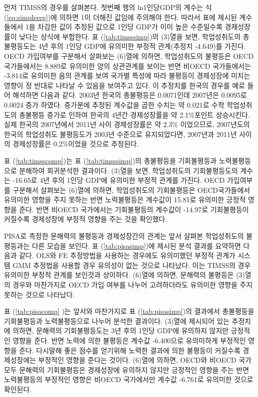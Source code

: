 
먼저 TIMSS의 경우를 살펴본다.
첫번째 행의 ln1인당GDP의 계수는 식 (\ref{eq:simplereg})에 의하면 1이 더해진 값임에 주의해야 한다. 따라서 표에 제시된 계수들에서 1을 차감한 값이 추정된 값으로 1인당 GDP가 이미 높은 수준일수록 경제성장률이 낮다는 상식에 부합한다.
표 (\ref{tab:timsssimp})의 (3)열을 보면, 학업성취도의 총불평등도는 4년 후의 1인당 GDP에 유의미한 부정적 관계(추정치 -4.649)를 가진다.
OECD 가입여부를 구분해서 살펴보는 (6)열에 의하면, 학업성취도의 불평등은 OECD국가들에서는 8.889로 유의미한 양의 상관관계를 보이는 반면 비OECD 국가들에서는 -3.814로 유의미한 음의 관계를 보여 국가별 특성에 따라 불평등이 경제성장에 미치는 영향이 정 반대로 나타날 수 있음을 보여주고 있다.
이 추정치를 한국의 경우를 예로 들어 해석하면 다음과 같다. 2003년 한국의 총불평등은 0.0071인데 2007년은 0.0095로 0.0024 증가 하였다. 증가분에 추정된 계수값을 곱한 수치는 약 0.021로 수학 학업성취도의 총불평등 증가로 인하여 한국의 4년간 경제성장률을 약 2.1\%포인트 상승시킨다. 실제 한국의 2007년에서 2011년 사이 경제성장률은 약 2.3\% 이었으므로, 2007년도의 한국의 학업성취도 불평등도가 2003년 수준으로 유지되었다면, 2007년과 2011년 사이의 경제성장률은 0.2\%이었을 것으로 추정된다.


표 (\ref{tab:timsscomp})는 표 (\ref{tab:timsssimp})의 총불평등을 기회불평등과 노력불평등으로 분해하여 회귀분석한 결과이다.
(3)열을 보면, 학업성취도의 기회불평등도의 계수는 -16.65로 4년 후의 1인당 GDP에 유의미한 부정적 관계를 가진다.
OECD 가입여부를 구분해서 살펴보는 (6)열에 의하면, 학업성취도의 기회불평등은 OECD국가들에서 유의미한 영향을 주지 못하는 반면 노력불평등은 계수값이 15.81로 유의미한 긍정적 영향을 준다. 반면 비OECD 국가에서는 기회불평등의 계수값이 -14.97로 기회불평등이 커질수록 경제성장에 부정적 영향을 주는 것을 확인했다.


PISA로 측정한 문해력의 불평등과 경제성장간의 관계는 앞서 살펴본 학업성취도의 불평등과는 다른 모습을 보인다.
표 (\ref{tab:pisasimp})에 제시된 분석 결과를 요약하면 다음과 같다.
OLS와 FE 추정방법을 사용하는 경우에도 유의미했던 부정적 관계가 시스템 GMM 추정법을 사용할 경우 유의성이 없는 것으로 나타났다.
이는 TIMSS의 경우 유의미한 부정적 관계를 보인것과 상이하다.
(6)열에 의하면, 문해력의 불평등은 (3)열의 경우와 마찬가지로 OECD 가입 여부를 나누어 고려하더라도 유의미한 영향을 주지 못하는 것으로 나타났다.


표 (\ref{tab:pisacomp} )는 앞서와 마찬가지로 표 (\ref{tab:pisasimp})의 결과에서 총불평등을 기회불평등과 노력불평등으로 나누어 분석한 결과이다.
(3)열에 제시되어 있는 추정치에 의하면, 문해력의 기회불평등도는 3년 후의 1인당 GDP에 유의하지 않지만 긍정적인 영향을 준다.
반면 노력에 의한 불평등은 계수값 -6.400으로 유의미하게 부정적인 영향을 준다. 
다시말해 좋은 점수를 얻기위해 노력한 결과에 의한 불평등이 커질수록 경제성장에는 부정적인 영향을 준다는 것이다.
(6)열에 의하면, OECD와 비OECD 국가 모두 문해력의 기회불평등은 경제성장에 유의하지 않지만 긍정적인 영향을 주는 반면 노력불평등의 부정적인 영향은 비OECD 국가에서만 계수값 -6.761로 유의미한 것으로 확인된다.

